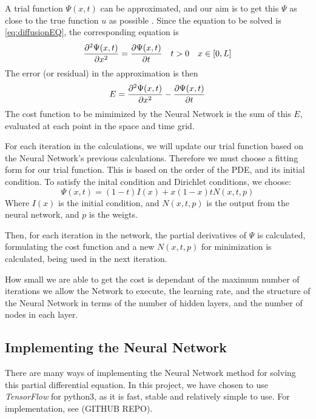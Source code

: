 A trial function $\Psi (x,t)$ can be approximated, and our aim is to get this $\Psi$ as close to the true function $u$ as possible \cite{lagaris1998artificial}. Since the equation to be solved is \eqref{eq:diffusionEQ}, the corresponding equation is
\begin{equation*}
    \pdv[2]{\Psi(x,t)}{x} = \pdv{\Psi(x,t)}{t} \quad t>0 \quad x\in [0,L]
\end{equation*}
The error (or residual) in the approximation is then
\begin{equation}
    E = \pdv[2]{\Psi(x,t)}{x} - \pdv{\Psi(x,t)}{t}
    \label{eq:errorFunc}
\end{equation}
The cost function to be mimimized by the Neural Network is the sum of this $E$, evaluated at each point in the space and time grid.

For each iteration in the calculations, we will update our trial function based on the Neural Network's previous calculations. Therefore we must choose a fitting form for our trial function. This is based on the order of the PDE, and its initial condition. To satisfy the inital condition and Dirichlet conditions, we choose:
\begin{equation}
    \Psi (x,t) = (1-t)I(x) + x(1-x)tN(x,t,p)
    \label{eq:trialFunction}
\end{equation}
Where $I(x)$ is the initial condition, and $N(x,t,p)$ is the output from the neural network, and $p$ is the weigts.

Then, for each iteration in the network, the partial derivatives of $\Psi$ is calculated, formulating the cost function and a new $N(x,t,p)$ for minimization is calculated, being used in the next iteration.

How small we are able to get the cost is dependant of the maximum number of iterations we allow the Network to execute, the learning rate, and the structure of the Neural Network in terms of the number of hidden layers, and the number of nodes in each layer.

\subsection{Implementing the Neural Network}
There are many ways of implementing the Neural Network method for solving this partial differential equation. In this project, we have chosen to use \textit{TensorFlow} for python3, as it is fast, stable and relatively simple to use. For implementation, see (GITHUB REPO).
